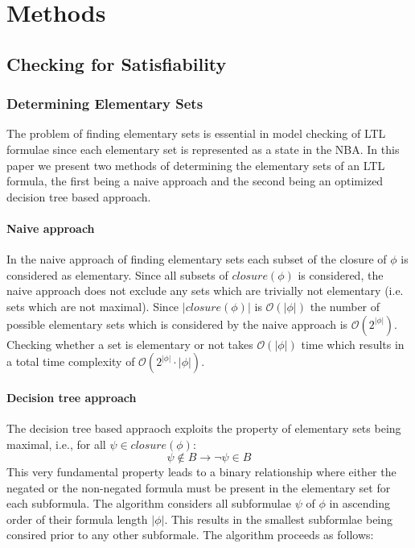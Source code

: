 \section{Methods}
\subsection{Checking for Satisfiability}

\subsubsection{Determining Elementary Sets}
The problem of finding elementary sets is essential in model checking of LTL formulae since each elementary set is represented as a state in the NBA. In this paper we present two methods of determining the elementary sets of an LTL formula, the first being a naive approach and the second being an optimized decision tree based approach.


\paragraph{Naive approach}
In the naive approach of finding elementary sets each subset of the closure of $\phi$ is considered as elementary. Since all subsets of $closure(\phi)$ is considered, the naive approach does not exclude any sets which are trivially not elementary (i.e. sets which are not maximal). Since $|closure(\phi)|$ is $\mathcal{O}(|\phi|)$ the number of possible elementary sets which is considered by the naive approach is $\mathcal{O}(2^{|\phi|})$. Checking whether a set is elementary or not takes $\mathcal{O}(|\phi|)$ time which results in a total time complexity of $\mathcal{O}(2^{|\phi|}\cdot |\phi|)$.

\paragraph{Decision tree approach}
The decision tree based appraoch exploits the property of elementary sets being maximal, i.e., for all $\psi \in closure(\phi)$:
\begin{equation*}
  \psi \notin B \rightarrow \lnot \psi \in B
\end{equation*}
This very fundamental property leads to a binary relationship where either the negated or the non-negated formula must be present in the elementary set for each subformula. The algorithm considers all subformulae $\psi$ of $\phi$ in ascending order of their formula length $|\phi|$. This results in the smallest subformlae being consired prior to any other subformale. The algorithm proceeds as follows: 

